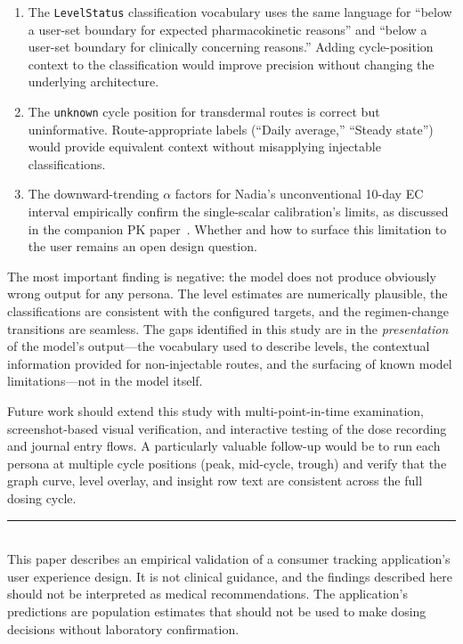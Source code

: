 \documentclass[11pt,a4paper]{article}
\newcommand{\code}[1]{\texttt{\small #1}}
\begin{document}
\begin{enumerate}[nosep,leftmargin=1.4em]
\item The \code{LevelStatus} classification vocabulary uses the same
  language for ``below a user-set boundary for expected pharmacokinetic
  reasons'' and ``below a user-set boundary for clinically concerning
  reasons.'' Adding cycle-position context to the classification would
  improve precision without changing the underlying architecture.
\item The \code{unknown} cycle position for transdermal routes is correct
  but uninformative. Route-appropriate labels (``Daily average,'' ``Steady
  state'') would provide equivalent context without misapplying injectable
  classifications.
\item The downward-trending $\alpha$ factors for Nadia's unconventional
  10-day EC interval empirically confirm the single-scalar calibration's
  limits, as discussed in the companion PK paper~\cite{xtpk}. Whether and
  how to surface this limitation to the user remains an open design
  question.
\end{enumerate}

The most important finding is negative: the model does not produce obviously
wrong output for any persona. The level estimates are numerically plausible,
the classifications are consistent with the configured targets, and the
regimen-change transitions are seamless. The gaps identified in this study
are in the \emph{presentation} of the model's output---the vocabulary used
to describe levels, the contextual information provided for non-injectable
routes, and the surfacing of known model limitations---not in the model
itself.

Future work should extend this study with multi-point-in-time examination,
screenshot-based visual verification, and interactive testing of the dose
recording and journal entry flows. A particularly valuable follow-up would
be to run each persona at multiple cycle positions (peak, mid-cycle, trough)
and verify that the graph curve, level overlay, and insight row text are
consistent across the full dosing cycle.

\vfill
\noindent\rule{\linewidth}{0.4pt}\\[0.3em]
{\footnotesize This paper describes an empirical validation of a consumer
tracking application's user experience design. It is not clinical guidance,
and the findings described here should not be interpreted as medical
recommendations. The application's predictions are population estimates
that should not be used to make dosing decisions without laboratory
confirmation.}
\end{document}
